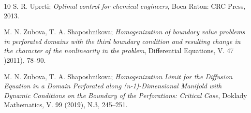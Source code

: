 \documentclass[reqno]{amsart}
\begin{document}
\begin{thebibliography}{10}
 S. R. Upreti;
\emph{Optimal control for chemical engineers},
Boca Raton: CRC Press, 2013.

 M. N. Zubova, T. A. Shaposhnikova;
\emph{Homogenization of boundary value problems in perforated domains with 
the third boundary condition and resulting change in the character of the 
nonlinearity in the problem}, Differential Equations, V. 47 )2011), 78--90.

 M. N. Zubova, T. A. Shaposhnikova;
\emph{Homogenization Limit for the Diffusion Equation in a Domain Perforated along
(n-1)-Dimensional Manifold with Dynamic Conditions on the Boundary of the
Perforations: Critical Case}, Doklady Mathematics, V. 99 (2019), N.3, 245--251.

\end{thebibliography}
\end{document}
